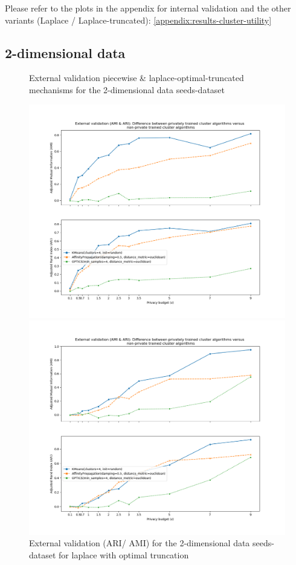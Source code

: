 Please refer to the plots in the appendix for internal validation and the other variants (Laplace / Laplace-truncated): \ref{appendix:results-cluster-utility}
\subsection{2-dimensional data}
\begin{figure}[!htbp]
    \caption{External validation piecewise \& laplace-optimal-truncated mechanisms for the 2-dimensional data seeds-dataset}
    \centering
    \begin{minipage}[c]{0.49\textwidth}
        \includegraphics[width=1\textwidth]{Results/2d-laplace-optimal-truncated/seeds-dataset/ami-and-ari.png}
        \caption{External validation (ARI/ AMI) for the 2-dimensional data seeds-dataset for laplace with optimal truncation}
        \label{fig:external-validation-seeds-dataset_comparison_2d-laplace}
    \end{minipage}
    \begin{minipage}[c]{0.49\textwidth}
        \includegraphics[width=1\textwidth]{Results/2d-piecewise/seeds-dataset/ami-and-ari.png}

\end{minipage}
\end{figure}
